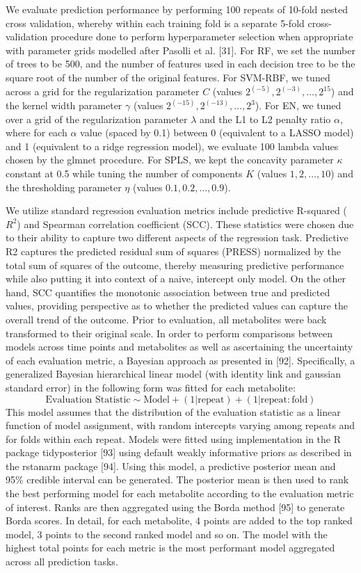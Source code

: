 We evaluate prediction performance by performing 100 repeats of 10-fold nested cross validation, whereby within each training fold is a separate 5-fold cross-validation procedure done to perform hyperparameter selection when appropriate with parameter grids modelled after Pasolli et al. [31]. For RF, we set the number of trees to be 500, and the number of features used in each decision tree to be the square root of the number of the original features. For SVM-RBF, we tuned across a grid for the regularization parameter $C$ (values $2^(-5),2^(-3),\ldots,2^15$) and the kernel width parameter $\gamma$ (values $2^(-15),2^(-13),\ldots,2^3$). For EN, we tuned over a grid of the regularization parameter $\lambda$ and the L1 to L2 penalty ratio $\alpha$, where for each $\alpha$ value (spaced by 0.1) between 0 (equivalent to a LASSO model) and 1 (equivalent to a ridge regression model), we evaluate 100 lambda values chosen by the glmnet procedure. For SPLS, we kept the concavity parameter $\kappa$ constant at 0.5 while tuning the number of components $K$ (values $1,2,\ldots,10$) and the thresholding parameter $\eta$ (values $0.1,0.2,\ldots,0.9$). 

We utilize standard regression evaluation metrics include predictive R-squared ($R^2$) and Spearman correlation coefficient (SCC). These statistics were chosen due to their ability to capture two different aspects of the regression task. Predictive R2 captures the predicted residual sum of squares (PRESS) normalized by the total sum of squares of the outcome, thereby measuring predictive performance while also putting it into context of a naive, intercept only model. On the other hand, SCC quantifies the monotonic association between true and predicted values, providing perspective as to  whether the predicted values can capture the overall trend of the outcome. Prior to evaluation, all metabolites were back transformed to their original scale. In order to perform comparisons between models across time points and metabolites as well as ascertaining the uncertainty of each evaluation metric, a Bayesian approach as presented in [92]. Specifically, a generalized Bayesian hierarchical linear model (with identity link and gaussian standard error) in the following form was fitted for each metabolite:
$$
\text{Evaluation Statistic} \sim \text{Model} + (1 | \text{repeat})+(1 | \text{repeat}:\text{fold})
$$
This model assumes that the distribution of the evaluation statistic as a linear function of model assignment, with random intercepts varying among repeats and for folds within each repeat. Models were fitted using implementation in the R package tidyposterior [93] using default weakly informative priors as described in the rstanarm package [94]. Using this model, a predictive posterior mean and 95\% credible interval can be generated. The posterior mean is then used to rank the best performing model for each metabolite according to the evaluation metric of interest. Ranks are then aggregated using the Borda method [95] to generate Borda scores. In detail, for each metabolite, 4 points are added to the top ranked model, 3 points to the second ranked model and so on. The model with the highest total points for each metric is the most performant model aggregated across all prediction tasks.
